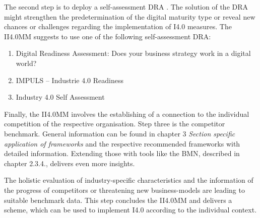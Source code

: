 The second step is to deploy a self-assessment \ac{DRA} \cite{Schumacher2016161} \cite{ReadinessIndustrie40Impulse} \cite{i40-self-assessment-PwC:2016}. The solution of the \ac{DRA} might strengthen the predetermination of the digital maturity type or reveal new chances or challenges regarding the implementation of \ac{I4.0} measures. The \ac{II4.0MM} suggests to use one of the following self-assessment \ac{DRA}:
\begin{enumerate}
\item Digital Readiness Assessment: Does your business strategy work in a digital world? \cite{ey-dra}
\item IMPULS – Industrie 4.0 Readiness \cite{ReadinessIndustrie40Impulse}
\item Industry 4.0 Self Assessment \cite{i40-self-assessment-PwC:2016}
\end{enumerate}

Finally, the \ac{II4.0MM} involves the establishing of a connection to the individual competition of the respective organisation. Step three is the competitor benchmark. General information can be found in chapter 3 \emph{Section specific application of frameworks} and the respective recommended frameworks with detailed information. Extending those with tools like the \ac{BMN}, described in chapter 2.3.4., delivers even more insights.

The holistic evaluation of industry-specific characteristics and the information of the progress of competitors or threatening new business-models are leading to suitable benchmark data. This step concludes the \ac{II4.0MM} and delivers a scheme, which can be used to implement \ac{I4.0} according to the individual context.